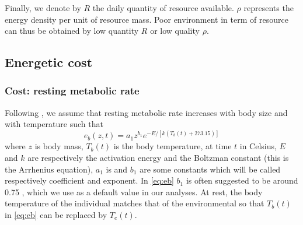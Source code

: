Finally, we denote by $R$ the daily quantity of resource available.
$\rho$ represents the energy density per unit of resource mass. 
Poor environment in term of resource can thus be obtained by low quantity $R$ or low quality $\rho$.

\subsection*{Energetic cost}
\subsubsection*{Cost: resting metabolic rate}
Following \citet{Brown2004}, we assume that resting metabolic rate increases with body size and with temperature such that
\begin{equation} \label{eq:eb}
	e_b(z, t) = a_1 z^{b_1} e^{-E/[k (T_b(t)+ 273.15)]}
\end{equation}
where $z$ is body mass, $T_b(t)$ is the body temperature, at time $t$ in Celsius, $E$ and $k$ are respectively the activation energy and the Boltzman constant (this is the Arrhenius equation), $a_1$ is and $b_1$ are some constants which will be called respectively coefficient and exponent.
In \cref{eq:eb} $b_1$ is often suggested to be around 0.75 \citep{Kleiber1947, Peters1986, Brown2004}, which we use as a default value in our analyses.
At rest, the body temperature of the individual matches that of the environmental \citep[e.g.,][]{Bartholomew1978} so that $T_b(t)$ in \cref{eq:eb} can be replaced by $T_e(t)$.

